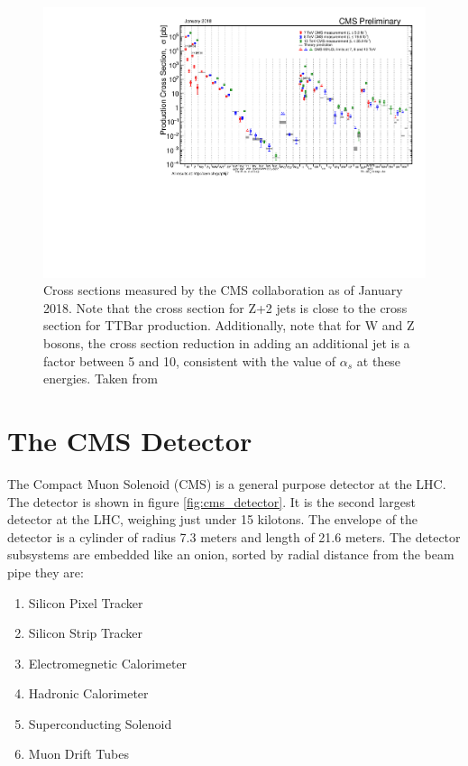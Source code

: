     \begin{figure}[h!]
      \centering
      \includegraphics[width=.7\textwidth]{figures/cms_cross_sections.pdf}
      \caption{Cross sections measured by the CMS collaboration as of January 2018. Note that the cross section for Z+2 jets is close to the cross section for TTBar production. Additionally, note that for W and Z bosons, the cross section reduction in adding an additional jet is a factor between 5 and 10, consistent with the value of $\alpha_s$ at these energies. Taken from \cite{cms_results}}
      \label{fig:cms_cross_sections}
    \end{figure}

\section{The CMS Detector}
  
  The Compact Muon Solenoid (CMS) is a general purpose detector at the LHC. The detector is shown in figure \ref{fig:cms_detector}. It is the second largest detector at the LHC, weighing just under 15 kilotons. The envelope of the detector is a cylinder of radius 7.3 meters and length of 21.6 meters. The detector subsystems are embedded like an onion, sorted by radial distance from the beam pipe they are:

  \begin{enumerate}
    \item{Silicon Pixel Tracker}
    \item{Silicon Strip Tracker}
    \item{Electromegnetic Calorimeter}
    \item{Hadronic Calorimeter}
    \item{Superconducting Solenoid}
    \item{Muon Drift Tubes}
  \end{enumerate}

